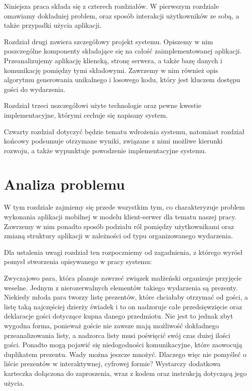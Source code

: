 \documentclass[12pt,titlepage]{article}
\begin{document}
Niniejsza praca składa się z czterech rozdziałów. W pierwszym rozdziale omawiamy dokładniej problem, oraz sposób interakcji użytkowników ze sobą, a także
przypadki użycia aplikacji.

Rozdział drugi zawiera szczegółowy projekt systemu. Opiszemy w nim poszczególne komponenty składające się na całość zaimplementowanej aplikacji. Przeanalizujemy
aplikację kliencką, stronę serwera, a także bazę danych i komunikację pomiędzy tymi składowymi. Zawrzemy w nim również opis algorytmu generowania unikalnego i losowego
kodu, który jest kluczem dostępu gości do wydarzenia.

Rozdział trzeci uszczegółowi użyte technologie oraz pewne kwestie implementacyjne, którymi cechuje się napisany system.

Czwarty rozdział dotyczyć będzie tematu wdrożenia systemu, natomiast rozdział końcowy podsumuje otrzymane wyniki, związane z nimi możliwe kierunki rozwoju,
a także wypunktuje powodzenie implementacyjne systemu.

\newpage
\section{Analiza problemu}
W tym rozdziale zajmiemy się przede wszystkim tym, co charakteryzuje problem wykonania aplikacji mobilnej w modelu klient-serwer dla tematu naszej pracy. Zawrzemy w nim
ponadto sposób podziału ról pomiędzy użytkownikami oraz zmianą struktury aplikacji w zależności od typu organizowanego wydarzenia.

Dla ustalenia uwagi rozdział ten rozpoczniemy od zagadnienia, z którego wyrósł pomysł stworzenia opisywanego w pracy systemu:

\begin{beamerlikethm}{}
Zwyczajowo para, która planuje zawrzeć związek małżeński organizuje przyjęcie weselne. Jednym z nierozerwalnych elementów takiego wydarzenia są prezenty.
Niekiedy młoda para tworzy listę prezentów, które chciałaby otrzymać od gości, a listę taką najczęściej dzierży świadek i to on nadzoruje całe przedsięwzięcie
oraz deklaracje gości dotyczące kupna danego przedmiotu. Nie jest to jednak zbyt wygodna forma, ponieważ goście nie zawsze mają możliwość dokładnego przeanalizowania
listy, a nadzorca listy musi poświęcić swój czas dużej ilości gości. Ponadto mogą pojawić się niedogodności komunikacyjne, które zaowocują duplikatem prezentu. Wady można
jeszcze mnożyć. Dlaczego więc nie pomyśleć o liście prezentów w interaktywnej, cyfrowej formie? Wystarczy dodatkowa karteczka dołączona do zaproszenia, wraz z kodem
oraz instrukcją dotyczącą jego użycia.
\end{beamerlikethm}
\end{document}
